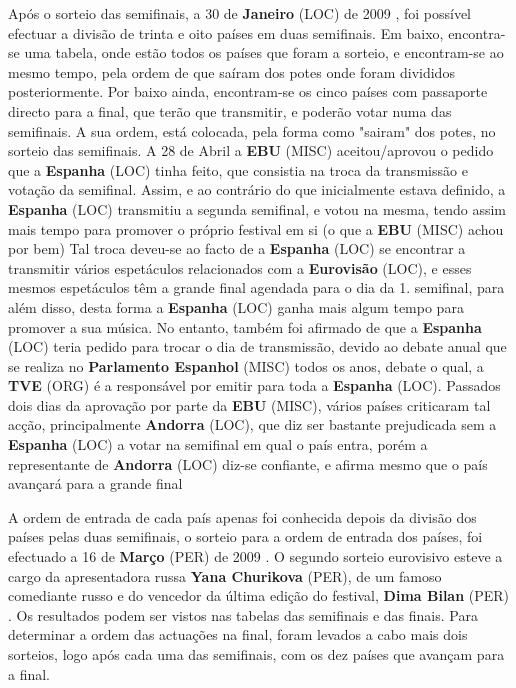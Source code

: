\documentclass[12pt,a4paper]{article}
\begin{document}
Após o sorteio das semifinais, a 30 de \textbf{Janeiro} (LOC) de 2009 , foi possível efectuar a divisão de trinta e oito países em duas semifinais. Em baixo, encontra-se uma tabela, onde estão todos os países que foram a sorteio, e encontram-se ao mesmo tempo, pela ordem de que saíram dos potes onde foram divididos posteriormente. Por baixo ainda, encontram-se os cinco países com passaporte directo para a final, que terão que transmitir, e poderão votar numa das semifinais. A sua ordem, está colocada, pela forma como "sairam" dos potes, no sorteio das semifinais. A 28 de Abril a \textbf{EBU} (MISC) aceitou/aprovou o pedido que a \textbf{Espanha} (LOC) tinha feito, que consistia na troca da transmissão e votação da semifinal. Assim, e ao contrário do que inicialmente estava definido, a \textbf{Espanha} (LOC) transmitiu a segunda semifinal, e votou na mesma, tendo assim mais tempo para promover o próprio festival em si (o que a \textbf{EBU} (MISC) achou por bem) Tal troca deveu-se ao facto de a \textbf{Espanha} (LOC) se encontrar a transmitir vários espetáculos relacionados com a \textbf{Eurovisão} (LOC), e esses mesmos espetáculos têm a grande final agendada para o dia da 1. semifinal, para além disso, desta forma a \textbf{Espanha} (LOC) ganha mais algum tempo para promover a sua música. No entanto, também foi afirmado de que a \textbf{Espanha} (LOC) teria pedido para trocar o dia de transmissão, devido ao debate anual que se realiza no \textbf{Parlamento Espanhol} (MISC) todos os anos, debate o qual, a \textbf{TVE} (ORG) é a responsável por emitir para toda a \textbf{Espanha} (LOC). Passados dois dias da aprovação por parte da \textbf{EBU} (MISC), vários países criticaram tal acção, principalmente \textbf{Andorra} (LOC), que diz ser bastante prejudicada sem a \textbf{Espanha} (LOC) a votar na semifinal em qual o país entra, porém a representante de \textbf{Andorra} (LOC) diz-se confiante, e afirma mesmo que o país avançará para a grande final

A ordem de entrada de cada país apenas foi conhecida depois da divisão dos países pelas duas semifinais, o sorteio para a ordem de entrada dos países, foi efectuado a 16 de \textbf{Março} (PER) de 2009 . O segundo sorteio eurovisivo esteve a cargo da apresentadora russa \textbf{Yana Churikova} (PER), de um famoso comediante russo e do vencedor da última edição do festival, \textbf{Dima Bilan} (PER) . Os resultados podem ser vistos nas tabelas das semifinais e das finais. Para determinar a ordem das actuações na final, foram levados a cabo mais dois sorteios, logo após cada uma das semifinais, com os dez países que avançam para a final.
\end{document}
